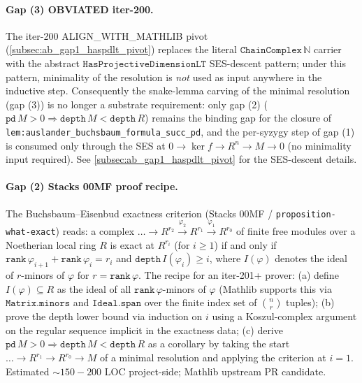 \paragraph{Gap (3) OBVIATED iter-200.} The iter-200 ALIGN\_WITH\_MATHLIB
pivot (\ref{subsec:ab_gap1_haspdlt_pivot}) replaces the literal
\(\texttt{ChainComplex}\,\mathbb N\) carrier with the abstract
\(\texttt{HasProjectiveDimensionLT}\) SES-descent pattern; under this
pattern, minimality of the resolution is \emph{not} used as input
anywhere in the inductive step. Consequently the snake-lemma carving
of the minimal resolution (gap (3)) is no longer a substrate
requirement: only gap (2) (\(\texttt{pd}\,M > 0 \Rightarrow
\texttt{depth}\,M < \texttt{depth}\,R\)) remains the binding gap for
the closure of \texttt{lem:auslander_buchsbaum_formula_succ_pd}, and the
per-syzygy step of gap (1) is consumed only through the SES at
\(0 \to \ker f \to R^n \to M \to 0\) (no minimality input required).
See \ref{subsec:ab_gap1_haspdlt_pivot} for the SES-descent details.

\paragraph{Gap (2) Stacks 00MF proof recipe.} The
Buchsbaum--Eisenbud exactness criterion (Stacks 00MF /
\texttt{proposition-what-exact}) reads: a complex
\(\dots \to R^{r_2} \xrightarrow{\varphi_2} R^{r_1}
 \xrightarrow{\varphi_1} R^{r_0}\) of finite free modules over a
Noetherian local ring \(R\) is exact at \(R^{r_i}\) (for \(i \geq 1\))
if and only if \(\texttt{rank}\,\varphi_{i+1} + \texttt{rank}\,\varphi_i
= r_i\) and \(\texttt{depth}\,I(\varphi_i) \geq i\), where
\(I(\varphi)\) denotes the ideal of \(r\)-minors of \(\varphi\) for
\(r = \texttt{rank}\,\varphi\). The recipe for an iter-201+ prover:
(a) define \(I(\varphi) \subseteq R\) as the ideal of all
\(\texttt{rank}\,\varphi\)-minors of \(\varphi\) (Mathlib supports
this via \(\texttt{Matrix.minors}\) and \(\texttt{Ideal.span}\) over the
finite index set of \(\binom{n}{r}\) tuples); (b) prove the depth
lower bound via induction on \(i\) using a Koszul-complex argument
on the regular sequence implicit in the exactness data; (c) derive
\(\texttt{pd}\,M > 0 \Rightarrow \texttt{depth}\,M < \texttt{depth}\,R\)
as a corollary by taking the start \(\dots \to R^{r_1} \to R^{r_0} \to
M\) of a minimal resolution and applying the criterion at \(i = 1\).
Estimated \(\sim 150-200\) LOC project-side; Mathlib upstream PR
candidate.

